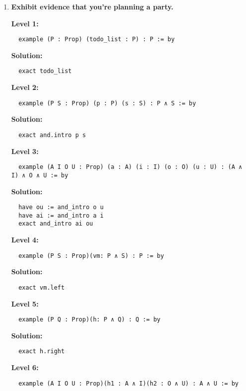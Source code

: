 \documentclass{article}
\theoremstyle{theorem}
\theoremstyle{definition}
\theoremstyle{remark}
\begin{document}
\begin{enumerate}
  \item \textbf{Exhibit evidence that you're planning a party.}

  \textbf{Level 1:}
  \begin{verbatim}
  example (P : Prop) (todo_list : P) : P := by
  \end{verbatim}

  \textbf{Solution:}
  \begin{verbatim}
  exact todo_list
  \end{verbatim}

  \textbf{Level 2:}
  \begin{verbatim}
  example (P S : Prop) (p : P) (s : S) : P ∧ S := by
  \end{verbatim}

  \textbf{Solution:}
  \begin{verbatim}
  exact and.intro p s
  \end{verbatim}

  \textbf{Level 3:}
  \begin{verbatim}
  example (A I O U : Prop) (a : A) (i : I) (o : O) (u : U) : (A ∧ I) ∧ O ∧ U := by
  \end{verbatim}

  \textbf{Solution:}
  \begin{verbatim}
  have ou := and_intro o u
  have ai := and_intro a i
  exact and_intro ai ou
  \end{verbatim}

  \textbf{Level 4:}
  \begin{verbatim}
  example (P S : Prop)(vm: P ∧ S) : P := by
  \end{verbatim}

  \textbf{Solution:}
  \begin{verbatim}
  exact vm.left
  \end{verbatim}

  \textbf{Level 5:}
  \begin{verbatim}
  example (P Q : Prop)(h: P ∧ Q) : Q := by
  \end{verbatim}

  \textbf{Solution:}
  \begin{verbatim}
  exact h.right
  \end{verbatim}

  \textbf{Level 6:}
  \begin{verbatim}
  example (A I O U : Prop)(h1 : A ∧ I)(h2 : O ∧ U) : A ∧ U := by
  \end{verbatim}


\end{enumerate}
\end{document}

